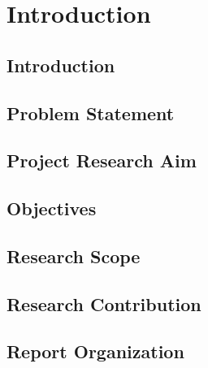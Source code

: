     \chapter{Introduction}

    \section{Introduction}
    

    \section{Problem Statement}
    

    \section{Project Research Aim}
    

    \section{Objectives}
    

    \section{Research Scope}
    

    \section{Research Contribution}
    

    \section{Report Organization}
    
